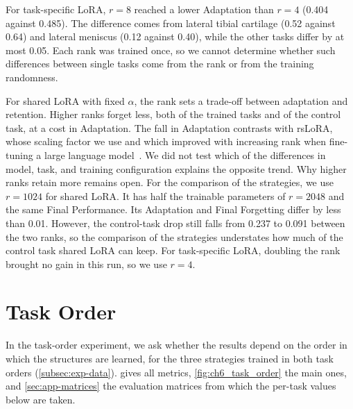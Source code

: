 For task-specific LoRA, $r = 8$ reached a lower Adaptation than $r = 4$ (0.404 against 0.485).
The difference comes from lateral tibial cartilage (0.52 against 0.64) and lateral meniscus (0.12 against 0.40), while the other tasks differ by at most 0.05.
Each rank was trained once, so we cannot determine whether such differences between single tasks come from the rank or from the training randomness.

For shared LoRA with fixed $\alpha$, the rank sets a trade-off between adaptation and retention.
Higher ranks forget less, both of the trained tasks and of the control task, at a cost in Adaptation.
The fall in Adaptation contrasts with rsLoRA, whose scaling factor we use and which improved with increasing rank when fine-tuning a large language model~\cite[Sec.~4]{kalajdzievski2023rankstabilizationscalingfactor}.
We did not test which of the differences in model, task, and training configuration explains the opposite trend.
Why higher ranks retain more remains open.
For the comparison of the strategies, we use $r = 1024$ for shared LoRA.
It has half the trainable parameters of $r = 2048$ and the same Final Performance.
Its Adaptation and Final Forgetting differ by less than 0.01.
However, the control-task drop still falls from 0.237 to 0.091 between the two ranks, so the comparison of the strategies understates how much of the control task shared LoRA can keep.
For task-specific LoRA, doubling the rank brought no gain in this run, so we use $r = 4$.

\section{Task Order}
\label{sec:exp-task-order}
In the task-order experiment, we ask whether the results depend on the order in which the structures are learned, for the three strategies trained in both task orders (\cref{subsec:exp-data}).
 gives all metrics, \cref{fig:ch6_task_order} the main ones, and \cref{sec:app-matrices} the evaluation matrices from which the per-task values below are taken.

\begin{table}[tb]
\centering
\caption[Results of the task-order experiment]{Results of the task-order experiment (full training split, one run each). The pretrained-model reference is computed for each task order. Mean \gls{dsc}; Adapt.: Adaptation; Forg.: Final Forgetting; Ctrl.\ drop: control-task drop; Final: Final Performance; Transf.: Transfer. $\uparrow$/$\downarrow$: higher/lower is better. $^{\dagger}$: zero or near zero by construction (\cref{subsec:method-lora}), not ranked.}
\label{tab:ch6_task_order}

\end{table}


